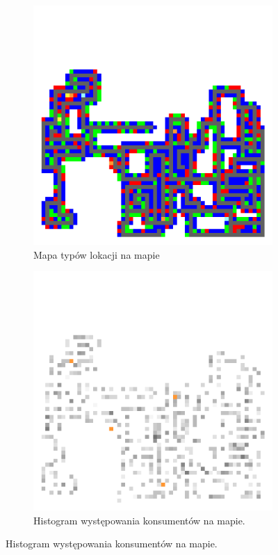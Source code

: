 \documentclass[polish, twoside, 12pt, a4paper]{article}
\theoremstyle{definition}
\theoremstyle{plain}
\theoremstyle{remark}
\begin{document}
\begin{figure}[hbt]
  \centering
  \begin{subfigure}[t]{0.45\textwidth}
    \includegraphics[width=\textwidth]{../mapy/typy.png}
    \caption{Mapa typów lokacji na mapie}
    \label{symulowanamapa}
  \end{subfigure}
  \hfill
  \begin{subfigure}[t]{0.45\textwidth}
    \includegraphics[width=\textwidth]{../mapy/ludnosc.png}
    \caption{Histogram występowania konsumentów na mapie.}
    \label{symulowanaludnosc}
  \end{subfigure}
  

\end{figure}
\end{document}
